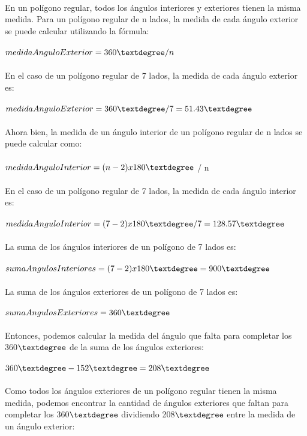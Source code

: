 \documentclass{article}
\begin{document}
\\
En un polígono regular, todos los ángulos interiores y exteriores tienen la misma medida. Para un polígono regular de n lados, la medida de cada ángulo exterior se puede calcular utilizando la fórmula:\\
\\
$medidaAnguloExterior = 360\textdegree / n$\\
\\
En el caso de un polígono regular de 7 lados, la medida de cada ángulo exterior es:\\
\\
$medidaAnguloExterior = 360\textdegree / 7 = 51.43\textdegree$\\
\\
Ahora bien, la medida de un ángulo interior de un polígono regular de n lados se puede calcular como:\\
\\
$medidaAnguloInterior = (n - 2) x 180\textdegree$ / n\\
\\
En el caso de un polígono regular de 7 lados, la medida de cada ángulo interior es:\\
\\
$medidaAnguloInterior = (7 - 2) x 180\textdegree / 7 = 128.57\textdegree$\\
\\
La suma de los ángulos interiores de un polígono de 7 lados es:\\
\\
$sumaAngulosInteriores = (7 - 2) x 180\textdegree = 900\textdegree$\\
\\
La suma de los ángulos exteriores de un polígono de 7 lados es:\\
\\
$sumaAngulosExteriores = 360\textdegree$\\
\\
Entonces, podemos calcular la medida del ángulo que falta para completar los 360$\textdegree$ de la suma de los ángulos exteriores:\\
\\
$360\textdegree - 152\textdegree = 208\textdegree$\\
\\
Como todos los ángulos exteriores de un polígono regular tienen la misma medida, podemos encontrar la cantidad de ángulos exteriores que faltan para completar los 360$\textdegree$ dividiendo 208$\textdegree$ entre la medida de un ángulo exterior:\\
\end{document}
